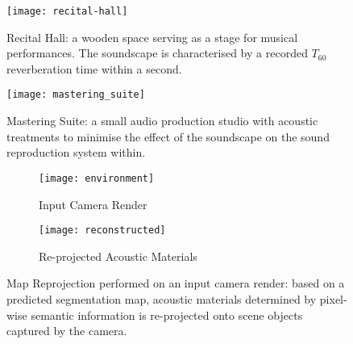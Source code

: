 \begin{figure}[htbp]
    \centering
    \texttt{[image: recital-hall]}
    \caption{Recital Hall: a wooden space serving as a stage for musical performances. The soundscape is characterised by a recorded $T_{60}$ reverberation time within a second.}
    \label{fig:conservatoire-iso-render}
\end{figure}

\begin{figure}[htbp]
    \centering
    \texttt{[image: mastering\_suite]}
    \caption{Mastering Suite: a small audio production studio with acoustic treatments to minimise the effect of the soundscape on the sound reproduction system within.}
    \label{fig:conservatoire-iso-render}
\end{figure}


\begin{figure}
    \centering
    \begin{subfigure}[t]{0.49\textwidth}
       \centering
       \texttt{[image: environment]}
       \caption{Input Camera Render}
       \label{fig:chi-input-env}
    \end{subfigure}
    \begin{subfigure}[t]{0.49\textwidth}
       \centering
       \texttt{[image: reconstructed]}
       \caption{Re-projected Acoustic Materials}
       \label{fig:chi-reconstructed-env}
    \end{subfigure}
\caption{Map Reprojection performed on an input camera render: based on a predicted segmentation map, acoustic materials determined by pixel-wise semantic information is re-projected onto scene objects captured by the camera.}
\label{fig:chi-scanning}
\end{figure}




